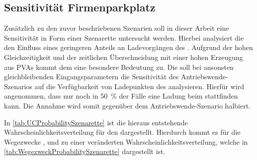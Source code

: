 


\subsection{Sensitivität Firmenparkplatz}

Zusätzlich zu den zuvor beschriebenen Szenarien soll in dieser Arbeit eine Sensitivität in Form einer Szenarette untersucht werden.
Hierbei analysiert die \SzeFirmenparkplatz den Einfluss eines geringeren Anteils an Ladevorgängen des \UC \Firmeparkplatzdot.
Aufgrund der hohen Gleichzeitigkeit und der zeitlichen Überschneidung mit einer hohen Erzeugung aus \glspl{PVA} kommt dem \UC \Firmeparkplatz eine besondere Bedeutung zu.
Die \SzeFirmenparkplatz soll bei ansonsten gleichbleibenden Eingangsparametern die Sensitivität des Antriebswende-Szenarios auf die Verfügbarkeit von Ladepunkten des \UC \Firmeparkplatz analysieren.
Hierfür wird angenommen, dass nur noch in \SI{50}{\percent} der Fälle eine Ladung beim \UC \Firmeparkplatz stattfinden kann.
Die Annahme wird somit gegenüber dem Antriebswende-Szenario halbiert.



In \autoref{tab:UCProbabilitySzenarette} ist die hieraus entstehende Wahrscheinlichkeitsverteilung für den \UC \Firmeparkplatz dargestellt.
Hierdurch kommt es für die Wegezwecke \Arbeitdot, \dienst und \Ausbildung zu einer veränderten Wahrscheinlichkeitsverteilung, welche in \autoref{tab:WegezweckProbabilitySzenarette} dargestellt ist.




\clearpage
